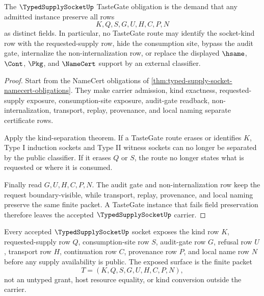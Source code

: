 \begin{theorem}
\label{thm:typed-supply-socket-tastegate-obligation}
The $\TypedSupplySocketUp$ TasteGate obligation is the demand that any admitted instance preserve all rows
$$
K,Q,S,G,U,H,C,P,N
$$
as distinct fields. In particular, no TasteGate route may identify the socket-kind row with the requested-supply row, hide the consumption site, bypass the audit gate, internalize the non-internalization row, or replace the displayed $\hsame$, $\Cont$, $\Pkg$, and $\NameCert$ support by an external classifier.
\end{theorem}

\begin{proof}
Start from the NameCert obligations of \autoref{thm:typed-supply-socket-namecert-obligations}. They make carrier admission, kind exactness, requested-supply exposure, consumption-site exposure, audit-gate readback, non-internalization, transport, replay, provenance, and local naming separate certificate rows.

Apply the kind-separation theorem. If a TasteGate route erases or identifies $K$, Type I induction sockets and Type II witness sockets can no longer be separated by the public classifier. If it erases $Q$ or $S$, the route no longer states what is requested or where it is consumed.

Finally read $G,U,H,C,P,N$. The audit gate and non-internalization row keep the request boundary-visible, while transport, replay, provenance, and local naming preserve the same finite packet. A TasteGate instance that fails field preservation therefore leaves the accepted $\TypedSupplySocketUp$ carrier.
\end{proof}

\begin{theorem}
\label{thm:typed-supply-socket-obligation-rows}
Every accepted $\TypedSupplySocketUp$ socket exposes the kind row $K$, requested-supply row $Q$, consumption-site row $S$, audit-gate row $G$, refusal row $U$, transport row $H$, continuation row $C$, provenance row $P$, and local name row $N$ before any supply availability is public. The exposed surface is the finite packet
$$
T=(K,Q,S,G,U,H,C,P,N),
$$
not an untyped grant, host resource equality, or kind conversion outside the carrier.
\end{theorem}

